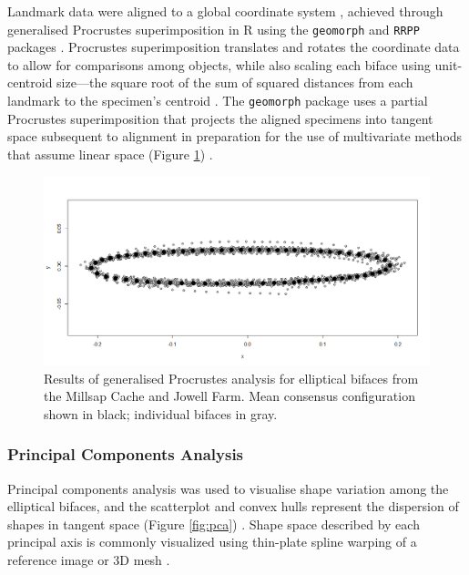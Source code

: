\documentclass[]{interact}
\theoremstyle{plain}%
\theoremstyle{definition}
\theoremstyle{remark}
\begin{document}
Landmark data were aligned to a global coordinate system
\citep{RN8477,RN7502,RN11622,RN11623,RN11563}, achieved through
generalised Procrustes superimposition \citep{RN11138,RN478,RN1646} in R
using the \texttt{geomorph} and \texttt{RRPP} packages
\citep{RN1655,RN11775,RN11530,RN1774,RN8605}. Procrustes superimposition
translates and rotates the coordinate data to allow for comparisons
among objects, while also scaling each biface using unit-centroid
size---the square root of the sum of squared distances from each
landmark to the specimen's centroid
\citep{RN11139,RN11140,RN11564,RN478}. The \texttt{geomorph} package
uses a partial Procrustes superimposition that projects the aligned
specimens into tangent space subsequent to alignment in preparation for
the use of multivariate methods that assume linear space (Figure
\ref{fig:gpa}) \citep{RN11141,RN11142,RN1646,RN11563}.

\begin{figure}\centering
\includegraphics[width=\linewidth]{figs/gpa.png}
\caption{Results of generalised Procrustes analysis for elliptical bifaces from the Millsap Cache and Jowell Farm. Mean consensus configuration shown in black; individual bifaces in gray.}
\label{fig:gpa}
\end{figure}

\hypertarget{principal-components-analysis}{%
\subsubsection{Principal Components
Analysis}\label{principal-components-analysis}}

Principal components analysis \citep{RN1746} was used to visualise shape
variation among the elliptical bifaces, and the scatterplot and convex
hulls represent the dispersion of shapes in tangent space (Figure
\ref{fig:pca}) \citep{RN8633,RN5616,RN11143,RN7550}. Shape space
described by each principal axis is commonly visualized using thin-plate
spline warping of a reference image or 3D mesh \citep{RN1731,RN479}.
\end{document}
